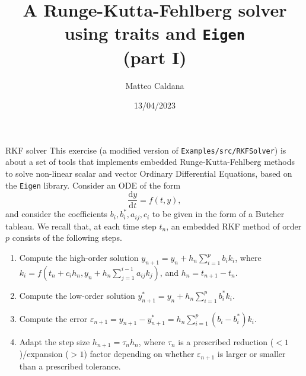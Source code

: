 \documentclass[10pt]{beamer}
\begin{document}
    \title{A Runge-Kutta-Fehlberg solver\protect\\using traits and \texttt{Eigen}\protect\\(part I)}
    \author{Matteo Caldana}
    \date{13/04/2023}

\begin{frame}
    \maketitle
\end{frame}

\begin{frame}{RKF solver}
This exercise (a modified version of \texttt{Examples/src/RKFSolver}) is about a set of tools that implements embedded Runge-Kutta-Fehlberg methods to solve non-linear scalar and vector Ordinary Differential Equations, based on the \texttt{Eigen} library.
\vfill
Consider an ODE of the form
\begin{equation*}
\frac{\mathrm{d} y}{\mathrm{d} t} = f(t, y),
\end{equation*}
and consider the coefficients \(b_i, b_i^*, a_{ij}, c_i\) to be given in the form of a Butcher tableau.
We recall that, at each time step \(t_n\), an embedded RKF method of order \(p\) consists of the following steps.
\begin{enumerate}
\item Compute the high-order solution \(y_{n+1} = y_{n} + h_n \sum_{i=1}^p b_i k_i\), where \(k_i = f\left(t_n + c_i h_n, y_n + h_n\sum_{j=1}^{i-1}a_{ij}k_j\right)\), and \(h_n = t_{n+1} - t_n\).
\item Compute the low-order solution \(y_{n+1}^* = y_{n} + h_n \sum_{i=1}^p b_i^* k_i\).
\item Compute the error \(\varepsilon_{n+1} = y_{n+1} - y_{n+1}^* = h_n \sum_{i=1}^p(b_i - b_i^*)k_i\).
\item Adapt the step size \(h_{n+1} = \tau_{n} h_{n}\), where \(\tau_{n}\) is a prescribed reduction (\(<1\))/expansion (\(>1\)) factor depending on whether \(\varepsilon_{n+1}\) is larger or smaller than a prescribed tolerance.
\end{enumerate}
\end{frame}
\end{document}
